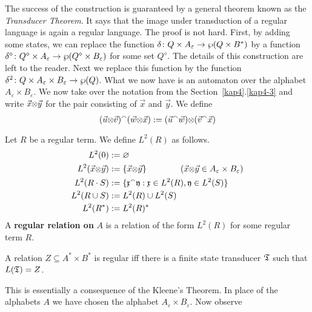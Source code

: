 The success of the construction is guaranteed by a general theorem
known as the {\it Transducer Theorem}. It says that the image under
transduction of a regular language is again a regular language.
The proof is not hard. First, by adding some states, we can replace 
the function $\delta \colon Q \times A_{\varepsilon} \rightarrow 
\wp(Q \times B^{\ast})$ by a function 
$\delta^{\diamond} \colon Q^{\diamond} \times A_{\varepsilon} \pf %
\wp(Q^{\diamond} \times B_{\varepsilon})$ for some set $Q^{\diamond}$. 
The details of this construction  are left to the reader.
Next we replace this function by the function 
$\delta^2 \colon Q \times A_{\varepsilon} 
\times B_{\varepsilon} \rightarrow \wp(Q)$. What we now have is an automaton 
over the alphabet $A_{\varepsilon} \times B_{\varepsilon}$. We now 
take over the notation from the Section~\ref{kap4}.\ref{kap4-3} and write 
$\vec{x} \mbox{\small$\otimes$} \vec{y}$ for the pair consisting of $\vec{x}$ 
and $\vec{y}$. We define
\begin{equation}
(\vec{u}\mbox{\small$\otimes$}\vec{v}) {^{\smallfrown}} (\vec{w}\mbox{\small$\otimes$}\vec{x})
    := (\vec{u}{^{\smallfrown}}\vec{w}) \mbox{\small$\otimes$} (\vec{v}{^{\smallfrown}} \vec{x})
\end{equation}
\begin{defn}
Let $R$ be a regular term. We define $L^2(R)$ as follows.
\begin{subequations}
\begin{align}
L^2(0) & := \varnothing \\
L^2(\vec{x}\mbox{\small$\otimes$} \vec{y}) & := \{\vec{x}\mbox{\small$\otimes$}\vec{y}\} 
   \qquad \qquad
(\vec{x}\mbox{\small$\otimes$}\vec{y} \in A_{\varepsilon} \times B_{\varepsilon}) \\
L^2(R \cdot S) & := \{\mathfrak{x} {^{\smallfrown}} \mathfrak{y} : \mathfrak{x} \in L^2(R), \mathfrak{y} \in L^2(S)\} \\
L^2(R \cup S) & := L^2(R) \cup L^2(S) \\
L^2(R^{\ast}) & := L^2(R)^{\ast} 
\end{align}
\end{subequations}
A \textbf{regular relation on} $A$ is a relation of the form
$L^2(R)$ for some regular term $R$.
\end{defn}
\begin{thm}
A relation $Z \subseteq A^{\ast} \times B^{\ast}$ is
regular iff there is a finite state transducer
$\mathfrak{T}$ such that $L(\mathfrak{T}) = Z$.
\end{thm}
This is essentially a consequence of the Kleene's Theorem.
In place of the alphabets $A$ we have chosen the alphabet
$A_{\varepsilon} \times B_{\varepsilon}$. Now observe
